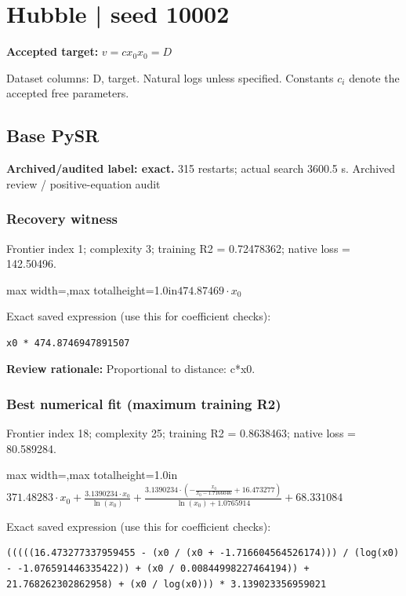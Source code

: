 \documentclass[10pt,letterpaper,landscape]{article}
\begin{document}
\section*{Hubble | seed 10002}
\textbf{Accepted target:} $\displaystyle v=c x_0$\hfill $x_0=D$\par
{\small Dataset columns: D, target. Natural logs unless specified. Constants $c_i$ denote the accepted free parameters.}\par\medskip
\begin{minipage}[t]{0.485\textwidth}
\subsection*{Base PySR}
\textbf{Archived/audited label: exact.} 315 restarts; actual search 3600.5 s.
{\small Archived review / positive-equation audit}
\subsubsection*{Recovery witness}
Frontier index 1; complexity 3; training R2 = 0.72478362; native loss = 142.50496.
\begin{center}\begin{adjustbox}{max width=\linewidth,max totalheight=1.0in}$\displaystyle 474.87469 \cdot x_{0}$\end{adjustbox}\end{center}
{\scriptsize Exact saved expression (use this for coefficient checks):}
\begin{lstlisting}
x0 * 474.8746947891507
\end{lstlisting}
{\small\textbf{Review rationale:} Proportional to distance: c*x0.}
\subsubsection*{Best numerical fit (maximum training R2)}
Frontier index 18; complexity 25; training R2 = 0.8638463; native loss = 80.589284.
\begin{center}\begin{adjustbox}{max width=\linewidth,max totalheight=1.0in}$\displaystyle 371.48283 \cdot x_{0} + \frac{3.1390234 \cdot x_{0}}{\ln{\left(x_{0} \right)}} + \frac{3.1390234 \cdot \left(- \frac{x_{0}}{x_{0} - 1.7166046} + 16.473277\right)}{\ln{\left(x_{0} \right)} + 1.0765914} + 68.331084$\end{adjustbox}\end{center}
{\scriptsize Exact saved expression (use this for coefficient checks):}
\begin{lstlisting}
(((((16.473277337959455 - (x0 / (x0 + -1.716604564526174))) / (log(x0) - -1.076591446335422)) + (x0 / 0.00844998227464194)) + 21.768262302862958) + (x0 / log(x0))) * 3.139023356959021
\end{lstlisting}
\end{minipage}\hfill
\end{document}
